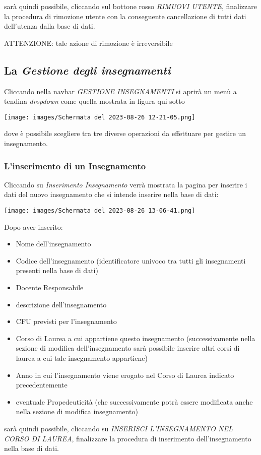 \documentclass{article}
\newcommand{\alert}[0]{\textcolor{red}{\faExclamationCircle}}
\begin{document}
    sarà quindi possibile, cliccando sul bottone rosso \textit{RIMUOVI UTENTE}, finalizzare la procedura di rimozione utente con la conseguente cancellazione di tutti dati dell'utenza dalla base di dati.

    \alert ATTENZIONE: tale azione di rimozione è irreversibile

    \pagebreak

    \subsection{La \textit{Gestione degli insegnamenti}}

    Cliccando nella navbar \textit{GESTIONE INSEGNAMENTI} si aprirà un menù a tendina \textit{dropdown} come quella mostrata in figura qui sotto
    \begin{center}
        \texttt{[image: images/Schermata del 2023-08-26 12-21-05.png]}
    \end{center}
    dove è possibile scegliere tra tre diverse operazioni da effettuare per gestire un insegnamento.
    \subsubsection{L'inserimento di un Insegnamento}
    Cliccando su \textit{Inserimento Insegnamento} verrà mostrata la pagina per inserire i dati del nuovo insegnamento che si intende inserire nella base di dati:

    \begin{center}
        \texttt{[image: images/Schermata del 2023-08-26 13-06-41.png]}
    \end{center}
    Dopo aver inserito:
    \begin{itemize}
        \item Nome dell'insegnamento
        \item Codice dell'insegnamento (identificatore univoco tra tutti gli insegnamenti presenti nella base di dati)
        \item Docente Responsabile
        \item descrizione dell'insegnamento
        \item CFU previsti per l'insegnamento
        \item Corso di Laurea a cui appartiene questo insegnamento (successivamente nella sezione di modifica dell'insegnamento sarà possibile inserire altri corsi di laurea a cui tale insegnamento appartiene)
        \item Anno in cui l'insegnamento viene erogato nel Corso di Laurea indicato precedentemente
        \item eventuale Propedeuticità (che successivamente potrà essere modificata anche nella sezione di modifica insegnamento)
    \end{itemize}
    sarà quindi possibile, cliccando su \textit{INSERISCI L'INSEGNAMENTO NEL CORSO DI LAUREA}, finalizzare la procedura di inserimento dell'insegnamento nella base di dati.
\end{document}
